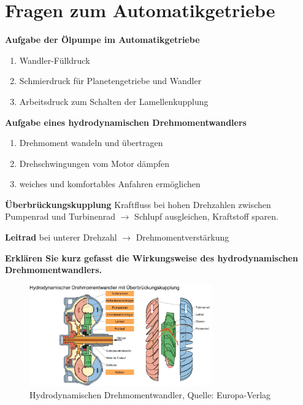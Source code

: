 \section{Fragen zum
Automatikgetriebe}\label{fragen-zum-automatikgetriebe}

\textbf{Aufgabe der Ölpumpe im Automatikgetriebe}

\begin{enumerate}
\item
  Wandler-Fülldruck
\item
  Schmierdruck für Planetengetriebe und Wandler
\item
  Arbeitsdruck zum Schalten der Lamellenkupplung
\end{enumerate}

\newpage

\textbf{Aufgabe eines hydrodynamischen Drehmomentwandlers}

\begin{enumerate}
\item
  Drehmoment wandeln und übertragen
\item
  Drehschwingungen vom Motor dämpfen
\item
  weiches und komfortables Anfahren ermöglichen
\end{enumerate}

\textbf{Überbrückungskupplung} Kraftfluss bei hohen Drehzahlen zwischen
Pumpenrad und Turbinenrad $\to$ Schlupf ausgleichen, Kraftstoff
sparen.

\textbf{Leitrad} bei unterer Drehzahl $\to$ Drehmomentverstärkung

\newpage

\textbf{Erklären Sie kurz gefasst die Wirkungsweise des hydrodynamischen
Drehmomentwandlers.}

\begin{figure}[!ht]%
\centering
\includegraphics[width=0.7\textwidth]{images/Automatikgetriebe/Automatikgetriebe-2.pdf}
\caption{Hydrodynamischen Drehmomentwandler, Quelle: Europa-Verlag}
\end{figure}

